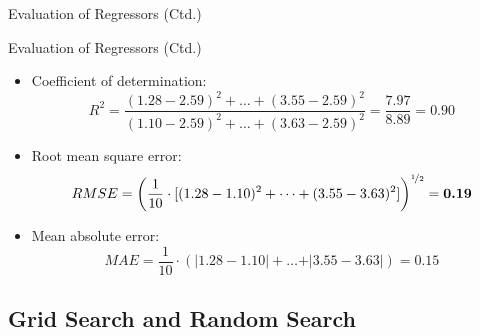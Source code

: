 \begin{frame}{Evaluation of Regressors (Ctd.)}{}
\end{frame}


\begin{frame}{Evaluation of Regressors (Ctd.)}{}
	\begin{itemize}
		\item Coefficient of determination:
		\scriptsize
		\begin{equation}
			R^2		= \frac{(1.28 - 2.59)^2 + \dots + (3.55 - 2.59)^2}{(1.10 - 2.59)^2 + \dots + (3.63 - 2.59)^2}
					= \frac{7.97}{8.89} = \bm{0.90}
		\end{equation}
		\normalsize
		\item Root mean square error:
		\scriptsize
		\begin{equation}
			RMSE = \left( \frac{1}{10} \cdot
				[(1.28 - 1.10)^2 + \dots + (3.55 - 3.63)^2] \right)^{\nicefrac{1}{2}} = \boldsymbol{0.19}
		\end{equation}
		\normalsize
		\item Mean absolute error:
		\scriptsize
		\begin{equation}
			MAE = \frac{1}{10} \cdot \left( \vert 1.28 - 1.10 \vert + \dots + \vert 3.55 - 3.63 \vert \right) = \bm{0.15}
		\end{equation}
	\end{itemize}
\end{frame}


\subsection{Grid Search and Random Search}


